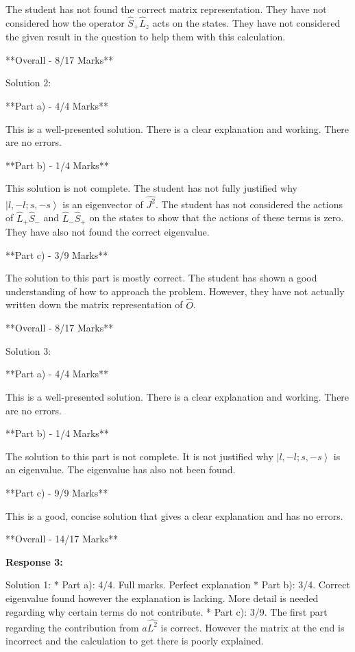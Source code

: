 \documentclass[a4paper,11pt]{article}
\begin{document}
The student has not found the correct matrix representation. They have not considered how the operator \( \hat{S}_+ \hat{L}_z \) acts on the states. They have not considered the given result in the question to help them with this calculation. 

**Overall - 8/17 Marks**

Solution 2:

**Part a) - 4/4 Marks**

This is a well-presented solution. There is a clear explanation and working. There are no errors. 

**Part b) - 1/4 Marks**

This solution is not complete. The student has not fully justified why \( \left|l, -l; s, -s \right> \) is an eigenvector of \( \hat{J^2} \). The student has not considered the actions of \( \hat{L}_+ \hat{S}_- \) and \( \hat{L}_- \hat{S}_+ \) on the states to show that the actions of these terms is zero. They have also not found the correct eigenvalue. 

**Part c) - 3/9 Marks**

The solution to this part is mostly correct. The student has shown a good understanding of how to approach the problem. However, they have not actually written down the matrix representation of \( \hat{O} \). 

**Overall - 8/17 Marks**

Solution 3:

**Part a) - 4/4 Marks**

This is a well-presented solution. There is a clear explanation and working. There are no errors. 

**Part b) - 1/4 Marks**

The solution to this part is not complete. It is not justified why \( \left|l, -l; s, -s \right> \) is an eigenvalue. The eigenvalue has also not been found. 

**Part c) - 9/9 Marks**

This is a good, concise solution that gives a clear explanation and has no errors. 

**Overall - 14/17 Marks**

\bigskip    
\textbf{Response 3:}

Solution 1: 
* Part a): 4/4. Full marks. Perfect explanation
* Part b): 3/4. Correct eigenvalue found however the explanation is lacking. More detail is needed regarding why certain terms do not contribute. 
* Part c): 3/9. The first part regarding the contribution from \( a\hat{L^{2}} \) is correct. However the matrix at the end is incorrect and the calculation to get there is poorly explained. 
\end{document}

